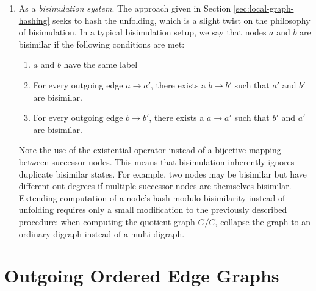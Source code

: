 \documentclass[twoside,leqno]{article}
\begin{document}
\begin{enumerate}
  \item As a \textit{bisimulation system}. The approach given in Section \ref{sec:local-graph-hashing} seeks to hash the unfolding, which is a slight twist on the philosophy of bisimulation. In a typical bisimulation setup, we say that nodes $a$ and $b$ are bisimilar if the following conditions are met:
  \begin{enumerate}
    \item $a$ and $b$ have the same label
    \item For every outgoing edge $a \rightarrow a'$, there exists a $b \rightarrow b'$ such that $a'$ and $b'$ are bisimilar.
    \item For every outgoing edge $b \rightarrow b'$, there exists a $a \rightarrow a'$ such that $b'$ and $a'$ are bisimilar.
  \end{enumerate}
  Note the use of the existential operator instead of a bijective mapping between successor nodes. This means that bisimulation inherently ignores duplicate bisimilar states. For example, two nodes may be bisimilar but have different out-degrees if multiple successor nodes are themselves bisimilar. Extending computation of a node's hash modulo bisimilarity instead of unfolding requires only a small modification to the previously described procedure: when computing the quotient graph $G/C$, collapse the graph to an ordinary digraph instead of a multi-digraph.
\end{enumerate}

\section{Outgoing Ordered Edge Graphs}
\label{sec:outgoing-ordered-edge-graphs}
\end{document}
